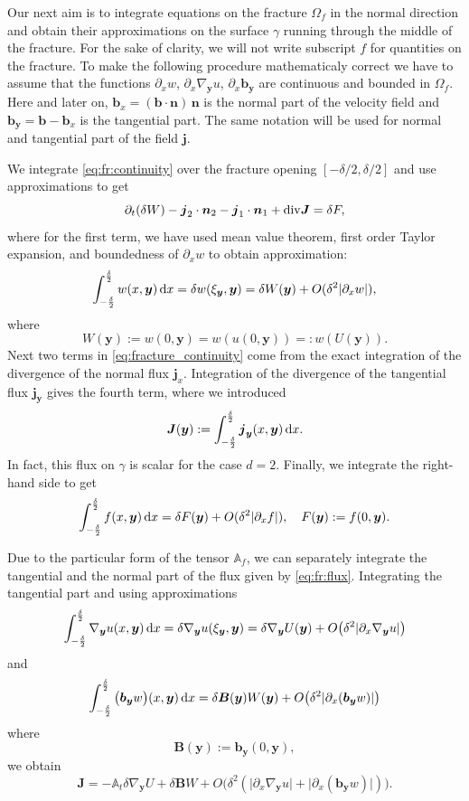 \documentclass[a4paper]{article}
\def\prtl{\partial}
\def\vc#1{\mathbf{\boldsymbol{#1}}}     %
\def\tn#1{{\mathbb{#1}}}    %
\def\abs#1{\lvert#1\rvert}
\def\div{{\rm div}}
\def\grad{\nabla}
\def\d {\,{\rm d}}
\begin{document}
Our next aim is to integrate equations on the fracture $\Omega_f$ in the normal direction 
and obtain their approximations on the surface $\gamma$ running through the middle of the fracture. 
For the sake of clarity, we will not write subscript $f$ for quantities on the fracture. 
To make the following procedure mathematicaly correct we have to assume that the functions
$\prtl_x w$, $\prtl_x \grad_{\vc y} u$, $\prtl_x \vc b_{\vc y}$ are continuous and bounded in $\Omega_f$. Here and later on, 
$\vc b_x=(\vc b \cdot \vc n)\, \vc n$ is the normal part of the velocity field and $\vc b_{\vc y} = \vc b - \vc b_x$ is the tangential part.
The same notation will be used for normal and tangential part of the field $\vc j$.

We integrate \eqref{eq:fr:continuity} over the fracture opening $[-\delta/2,\delta/2]$ and use approximations to get
\begin{equation}
    \label{eq:fracture_continuity}
   \prtl_t (\delta W) - \vc j_2 \cdot \vc n_2 - \vc j_1 \cdot \vc n_1 + \div \vc J = \delta F,
\end{equation}
where for the first term, we have used mean value theorem, first order Taylor expansion, 
and boundedness of $\prtl_x w$ to obtain approximation:
\[
    \int_{-\frac\delta2}^{\frac\delta2} w(x,\vc y) \d x=\delta w(\xi_{\vc y}, \vc y) = \delta W(\vc y) + O(\delta^2\abs{\prtl_x w}),
\]
where
\[
    W(\vc y):=w(0,\vc y)=w(u(0,\vc y))=:w(U(\vc y)).
\]
Next two terms in \eqref{eq:fracture_continuity} come from the exact integration 
of the divergence of the normal flux $\vc j_x$.
Integration of the divergence of the tangential flux $\vc j_{\vc y}$ gives the fourth term, where we introduced
\[
\vc J(\vc y) := \int_{-\frac\delta2}^{\frac\delta2} \vc j_{\vc y}(x, \vc y) \d x.
\]
In fact, this flux on $\gamma$ is scalar for the case $d=2$. Finally, we integrate the right-hand side to get 
\[
    \int_{-\frac\delta2}^{\frac\delta2} f(x,\vc y) \d x = \delta F(\vc y) + O(\delta^2\abs{\prtl_x f}),\quad F(\vc y):=f(0,\vc y). 
\]


Due to the particular form of the tensor $\tn A_f$, we can separately integrate the tangential and the normal
part of the flux given by \eqref{eq:fr:flux}. Integrating the tangential part and using approximations
\[
    \int_{-\frac\delta2}^{\frac\delta2}  \grad_{\vc y} u(x, \vc y) \d x = \delta \grad_{\vc y} u (\xi_{\vc y}, \vc y) 
    = \delta \grad_{\vc y} U( \vc y) + O\big( \delta^2 \abs{\prtl_x\grad_{\vc y} u} \big) 
\]
and
\[
 \int_{-\frac\delta2}^{\frac\delta2} \big(\vc b_{\vc y} w\big)(x, \vc y) \d x 
  = \delta \vc B(\vc y) W(\vc y) + O\big(\delta^2 \abs{\prtl_x(\vc b_{\vc y} w)} \big)
\]
where
\[
  \vc B(\vc y) := \vc b_{\vc y}(0, \vc y),
\]
we obtain
\begin{equation}
    \label{eq:fracture_darcy}
   \vc J = -\tn A_t \delta \grad_{\vc y} U + \delta \vc B W + O\big(\delta^2(\abs{\prtl_x\grad_{\vc y} u}+\abs{\prtl_x(\vc b_{\vc y} w)})\big).
\end{equation}
\end{document}
